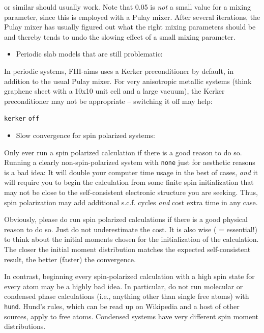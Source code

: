 or similar should usually work. Note that 
0.05 is \emph{not} a small value for a mixing parameter, since this is
employed with a Pulay mixer. After several iterations, the Pulay mixer
has usually figured out what the right mixing parameters should be and
thereby tends to undo the slowing effect of a small mixing parameter.

\begin{itemize}
  \item Periodic slab models that are still problematic:
\end{itemize}

In periodic systems, FHI-aims uses a Kerker preconditioner by default,
in addition to the usual Pulay mixer. For very anisotropic metallic
systems (think graphene sheet with a 10x10 unit cell and a large
vacuum), the Kerker preconditioner may not be appropriate -- switching
it off may help:

 \texttt{kerker} \texttt{off} \\

\begin{itemize}
  \item Slow convergence for spin polarized systems:
\end{itemize}

Only ever run a spin polarized calculation if there is a good reason
to do so. Running a clearly non-spin-polarized system with
 \texttt{none} just for aesthetic reasons is a bad
idea: It will double your computer time usage in the best of cases,
\emph{and} it will require you to begin the calculation from some
finite spin initialization that may not be close to the
self-consistent electronic structure you are seeking. Thus, spin
polarization may add additional s.c.f. cycles \emph{and} cost extra
time in any case.

Obviously, please do run spin polarized calculations if there is a
good physical reason to do so. Just do not underestimate the cost. It
is also wise ( = essential!) to think about the initial moments chosen
for the initialization of the calculation. The closer the initial
moment distribution matches the expected self-consistent result, the
better (faster) the convergence. 

In contrast, beginning every spin-polarized calculation with a high
spin state for every atom may be a highly bad idea. In particular, do
not run molecular or condensed phase calculations (i.e., anything
other than single free atoms) with  
\texttt{hund}. Hund's rules, which can be read up on Wikipedia and a
host of other sources, apply to free atoms. Condensed systems have
very different spin moment distributions.

